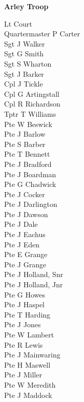 \vspace*{10mm}

\begin{center}
  \Large
  \textbf{Arley Troop}
\end{center}

\begin{multicols}{3}
  \small
  \noindent
  Lt Court \\
  Quartermaster P Carter \\
  Sgt J Walker \\
  Sgt G Smith \\
  Sgt S Wharton \\
  Sgt J Barker \\
  Cpl J Tickle \\
  Cpl G Artingstall \\
  Cpl R Richardson \\
  Tptr T Williams \\
  Pte W Beswick \\
  Pte J Barlow \\
  Pte S Barber \\
  Pte T Bennett \\
  Pte J Bradford \\
  Pte J Boardman \\
  Pte G Chadwick \\
  Pte J Cocker \\
  Pte J Darlington \\
  Pte J Dawson \\
  Pte J Dale \\
  Pte J Eachus \\
  Pte J Eden \\
  Pte E Grange \\
  Pte J Grange \\
  Pte J Holland, Snr \\
  Pte J Holland, Jnr \\
  Pte G Howes \\
  Pte J Haspel \\
  Pte T Harding \\
  Pte J Jones \\
  Pte W Lambert \\
  Pte R Lewis \\
  Pte J Mainwaring \\
  Pte H Maswell \\
  Pte J Miller \\
  Pte W Meredith \\
  Pte J Maddock \\

\end{multicols}
